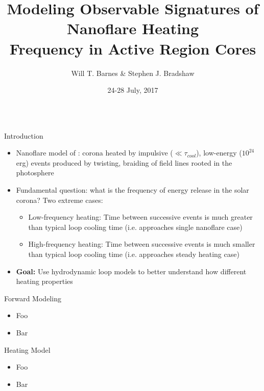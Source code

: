 \documentclass[final]{beamer}
\title[Observable Signatures of Nanoflares]{Modeling Observable Signatures of Nanoflare Heating\\Frequency in Active Region Cores}
\author[Barnes \& Bradshaw]{Will T. Barnes \& Stephen J. Bradshaw}
\institute[Rice University]{Department of Physics and Astronomy\\Rice University}
\date{24-28 July, 2017}
\begin{document}
\begin{frame}
  \begin{columns}[T]
  \hfill
  \begin{column}{0.49\linewidth}
    \begin{block}{Introduction}
    \vspace{-1ex}
    \begin{itemize}
      \item Nanoflare model of \citet{parker_nanoflares_1988}: corona heated by impulsive ($\ll\tau_{cool}$), low-energy ($10^{24}$ erg) events produced by twisting, braiding of field lines rooted in the photosphere
      \item Fundamental question: \alert{what is the frequency of energy release in the solar corona?} Two extreme cases:
      \begin{itemize}
        \item Low-frequency heating: Time between successive events is much greater than typical loop cooling time (i.e. approaches single nanoflare case)
        \item High-frequency heating: Time between successive events is much smaller than typical loop cooling time (i.e. approaches steady heating case)
      \end{itemize}
      \item \textbf{Goal:} \alert{Use hydrodynamic loop models to better understand how different heating properties}
    \end{itemize}
    \end{block}
    \begin{block}{Forward Modeling}
      \vspace{-1ex}
      \begin{itemize}
      \item Foo
      \item Bar
      \end{itemize}
    \end{block}
    \begin{block}{Heating Model}
      \vspace{-1ex}
      \begin{itemize}
      \item Foo
      \item Bar
      \end{itemize}
    \end{block}

\end{column}
\end{columns}
\end{frame}
\end{document}
